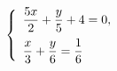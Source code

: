 \begin{ex}
	\begin{condition}
		\( \left\{
		\begin{array}{l}
			\dfrac{5x}{2}+\dfrac{y}{5}+4=0,\vspace{0,2cm}\\
			\dfrac{x}{3}+\dfrac{y}{6}=\dfrac{1}{6}
		\end{array}
		\right. \)
	\end{condition}
\end{ex}